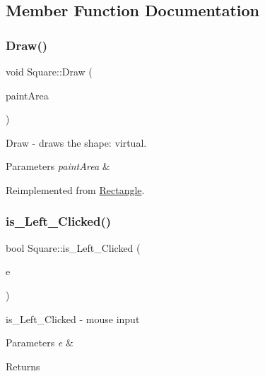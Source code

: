 \subsection{Member Function Documentation}
\mbox{\label{class_square_a30b97f9d3fbd7d226a887ac157b827a0}} 
\subsubsection{\texorpdfstring{Draw()}{Draw()}}
{\footnotesize\ttfamily void Square\+::\+Draw (\begin{DoxyParamCaption}\item[{\hyperlink{class_canvas}{Canvas} $\ast$}]{paint\+Area }\end{DoxyParamCaption})\hspace{0.3cm}{\ttfamily [virtual]}}



Draw -\/ draws the shape\+: virtual. 


\begin{DoxyParams}{Parameters}
{\em paint\+Area} & \\
\hline
\end{DoxyParams}


Reimplemented from \hyperlink{class_rectangle_afe989f9ae3ceffd9825b4f1492d764f3}{Rectangle}.

\mbox{\label{class_square_aaf0989a3dba67b2502f3a306e0136e69}} 
\subsubsection{\texorpdfstring{is\+\_\+\+Left\+\_\+\+Clicked()}{is\_Left\_Clicked()}}
{\footnotesize\ttfamily bool Square\+::is\+\_\+\+Left\+\_\+\+Clicked (\begin{DoxyParamCaption}\item[{Q\+Point}]{e }\end{DoxyParamCaption})\hspace{0.3cm}{\ttfamily [virtual]}}



is\+\_\+\+Left\+\_\+\+Clicked -\/ mouse input 


\begin{DoxyParams}{Parameters}
{\em e} & \\
\hline
\end{DoxyParams}
\begin{DoxyReturn}{Returns}

\end{DoxyReturn}


